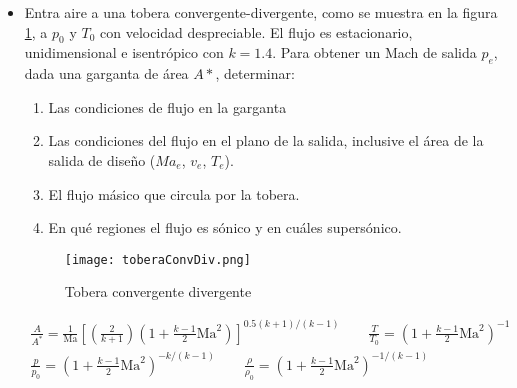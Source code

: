 \begin{itemize}
\item Entra aire a una tobera convergente-divergente, como se muestra en la figura \ref{fig:toberaConvDiv}, a $p_0$ y $T_0$ con velocidad despreciable. El flujo es estacionario, unidimensional e isentrópico con $k = 1.4$. Para obtener un Mach de salida $p_e$, dada una garganta de área $A*$, determinar:
\begin{enumerate}
\item Las condiciones de flujo en la garganta
\item Las condiciones del flujo en el plano de la salida, inclusive el área de la salida de diseño ($Ma_e$, $v_e$, $T_e$).
\item El flujo másico que circula por la tobera.
\item En qué regiones el flujo es sónico y en cuáles supersónico.
\end{enumerate}
\begin{figure}[h!!]
\centering
\texttt{[image: toberaConvDiv.png]}
\caption{Tobera convergente divergente}
\label{fig:toberaConvDiv}
\end{figure}
\begin{equation*}
\begin{aligned}
\frac{A}{A^*} = \frac{1}{\text{Ma}}\left[\left(\frac{2}{k+1}\right) \left(1 + \frac{k-1}{2}\text{Ma}^2\right)\right]^{0.5(k+1)/(k-1)}
\qquad
\frac{T}{T_0} = \left(1 + \frac{k-1}{2}\text{Ma}^2\right)^{-1}
\\
\frac{p}{p_0} = \left(1 + \frac{k-1}{2}\text{Ma}^2\right)^{-k/(k-1)}
\qquad
\frac{\rho}{\rho_0} = \left(1 + \frac{k-1}{2}\text{Ma}^2 \right)^{-1/(k-1)}
\end{aligned}
\end{equation*}


\end{itemize}
